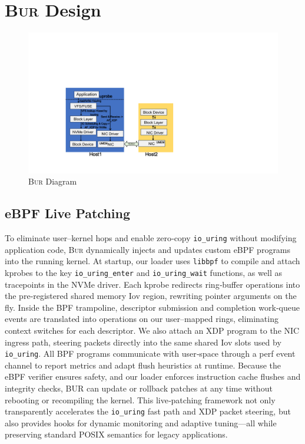 \documentclass[sigconf,10pt]{acmart}
\newcommand{\sys}{\textsc{Bur}\xspace}
\begin{document}
\section{\sys Design}\label{sec:design}

\begin{figure}
\centering
\includegraphics[width=\columnwidth]{img/bur.pdf}
\caption{\sys Diagram}\label{fig:bur}
\end{figure}
\subsection{eBPF Live Patching}

To eliminate user–kernel hops and enable zero‐copy \texttt{io\_uring} without modifying application code, \sys dynamically injects and updates custom eBPF programs into the running kernel. At startup, our loader uses \texttt{libbpf} to compile and attach kprobes to the key \texttt{io\_uring\_enter} and \texttt{io\_uring\_wait} functions, as well as tracepoints in the NVMe driver. Each kprobe redirects ring‐buffer operations into the pre‐registered shared memory Iov region, rewriting pointer arguments on the fly. Inside the BPF trampoline, descriptor submission and completion work‐queue events are translated into operations on our user–mapped rings, eliminating context switches for each descriptor. We also attach an XDP program to the NIC ingress path, steering packets directly into the same shared Iov slots used by \texttt{io\_uring}. All BPF programs communicate with user‐space through a perf event channel to report metrics and adapt flush heuristics at runtime. Because the eBPF verifier ensures safety, and our loader enforces instruction cache flushes and integrity checks, BUR can update or rollback patches at any time without rebooting or recompiling the kernel. This live‐patching framework not only transparently accelerates the \texttt{io\_uring} fast path and XDP packet steering, but also provides hooks for dynamic monitoring and adaptive tuning—all while preserving standard POSIX semantics for legacy applications.  
\end{document}

